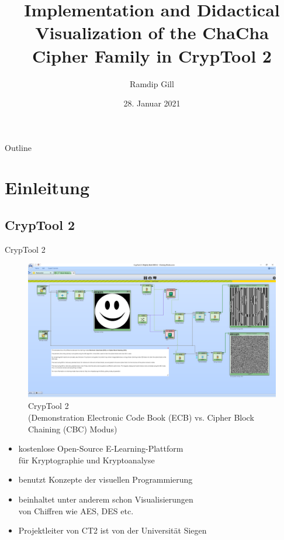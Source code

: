 \documentclass{beamer}
\title[Implementation and Visualization of the ChaCha Cipher Family in CrypTool 2]{Implementation and Didactical Visualization of the ChaCha Cipher Family in CrypTool 2}
\author{Ramdip Gill}
\institute{Universität Heidelberg}
\date{28. Januar 2021}
\begin{document}
\begin{frame}[plain]
  \titlepage
\end{frame}

\begin{frame}[plain]{Outline}
  \tableofcontents
\end{frame}

\section{Einleitung}

\subsection{CrypTool 2}
\begin{frame}{CrypTool 2}
\begin{figure}
\center
\begin{minipage}{.6\textwidth}
\includegraphics[width=\textwidth]{figures/010_Block_Modes_Symmetric_Ciphers.png}
\end{minipage}
\caption{CrypTool 2\\(Demonstration Electronic Code Book (ECB) vs. Cipher Block Chaining (CBC) Modus)}
\end{figure}
\begin{itemize}
\item kostenlose Open-Source E-Learning-Plattform\\für Kryptographie und Kryptoanalyse
\item benutzt Konzepte der visuellen Programmierung
\item beinhaltet unter anderem schon Visualisierungen \\von Chiffren wie AES, DES etc.
\item Projektleiter von CT2 ist von der Universität Siegen
\end{itemize}
\end{frame}
\end{document}
